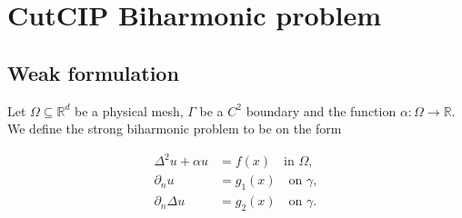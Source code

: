 
\newpage
\section{CutCIP Biharmonic problem}%
\label{sec:cutcip_biharmonic_problem}

\subsection{Weak formulation}%
\label{sub:weak_formulation}


Let $\Omega \subseteq    \mathbb{R} ^d$ be a physical mesh, $\Gamma  $ be a $C^2$ boundary and the function $\alpha: \Omega \to \mathbb{R}  $. We define the strong biharmonic problem to be on the form

\begin{equation}
\begin{split}
    \Delta^2  u  + \alpha  u  & = f( x)  \quad \text{in } \Omega,   \\
    \partial _{n} u & = g_{1}(x)   \quad \text{on } \gamma ,  \\
    \partial _{n} \Delta  u & = g_2(x)  \quad \text{on } \gamma  .  \\
\end{split}
\end{equation}

